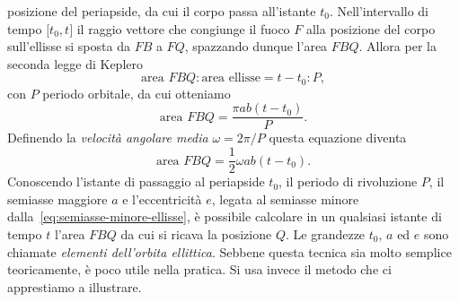 posizione del periapside, da cui il corpo passa all'istante
$t_0$. Nell'intervallo di tempo $\mathopen{[}t_0, t\mathclose{]}$ il raggio
vettore che congiunge il fuoco $F$ alla posizione del corpo sull'ellisse si
sposta da $FB$ a $FQ$, spazzando dunque l'area $FBQ$. Allora per la seconda
legge di Keplero
\begin{equation}
  \text{area } FBQ : \text{area ellisse} = t-t_0 : P,
\end{equation}
con $P$ periodo orbitale, da cui otteniamo
\begin{equation}
  \text{area } FBQ = \frac{\pi ab(t-t_0)}{P}.
\end{equation}
Definendo la \emph{velocità angolare media} $\omega = 2\pi/P$ questa equazione
diventa
\begin{equation}
  \text{area } FBQ = \frac{1}{2}\omega ab(t-t_0).
\end{equation}
Conoscendo l'istante di passaggio al periapside $t_0$, il periodo di rivoluzione
$P$, il semiasse maggiore $a$ e l'eccentricità $e$, legata al semiasse minore
dalla~\eqref{eq:semiasse-minore-ellisse}, è possibile calcolare in un qualsiasi
istante di tempo $t$ l'area $FBQ$ da cui si ricava la posizione $Q$. Le
grandezze $t_0$, $a$ ed $e$ sono chiamate \emph{elementi dell'orbita
  ellittica}. Sebbene questa tecnica sia molto semplice teoricamente, è poco
utile nella pratica. Si usa invece il metodo che ci apprestiamo a illustrare.


